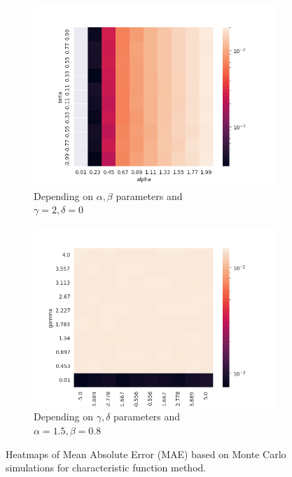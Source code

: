 \documentclass{article}
\begin{document}
		\begin{figure}[H]
			\begin{subfigure}{.5\textwidth}
				\centering
				\includegraphics[width=1\linewidth]{images/heatmap_cf_MAE_alpha_beta.png}
				\caption{Depending on $\alpha, \beta$ parameters and \\$\gamma = 2, \delta = 0$}
			\end{subfigure}
			\begin{subfigure}[r]{.5\textwidth}
				\centering
				\includegraphics[width=1\linewidth]{images/heatmap_cf_MAE_gamma_delta.png}
				\caption{Depending on $\gamma, \delta$ parameters and \\$\alpha = 1.5, \beta = 0.8$}
			\end{subfigure}
			\caption{Heatmaps of Mean Absolute Error (MAE) based on Monte Carlo simulations for characteristic function method.}
		\end{figure}
		
\end{document}
